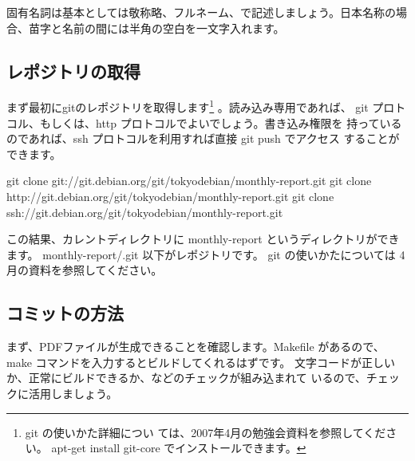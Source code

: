\documentclass[mingoth,a4paper]{jsarticle}
\begin{document}
固有名詞は基本としては敬称略、フルネーム、で記述しましょう。日本名称の場
合、苗字と名前の間には半角の空白を一文字入れます。

\subsection{レポジトリの取得}

まず最初にgitのレポジトリを取得します\footnote{git の使いかた詳細につい
ては、2007年4月の勉強会資料を参照してください。 apt-get install git-core
でインストールできます。} 。読み込み専用であれば、
git プロトコル、もしくは、http プロトコルでよいでしょう。書き込み権限を
持っているのであれば、ssh プロトコルを利用すれば直接 git push でアクセス
することができます。


\begin{commandline}
 git clone git://git.debian.org/git/tokyodebian/monthly-report.git
 git clone http://git.debian.org/git/tokyodebian/monthly-report.git
 git clone ssh://git.debian.org/git/tokyodebian/monthly-report.git
\end{commandline}

この結果、カレントディレクトリに monthly-report というディレクトリができ
ます。
monthly-report/.git 以下がレポジトリです。
git の使いかたについては 4 月の資料を参照してください。


\subsection{コミットの方法}

まず、PDFファイルが生成できることを確認します。Makefile があるので、make 
コマンドを入力するとビルドしてくれるはずです。
文字コードが正しいか、正常にビルドできるか、などのチェックが組み込まれて
いるので、チェックに活用しましょう。
\end{document}
